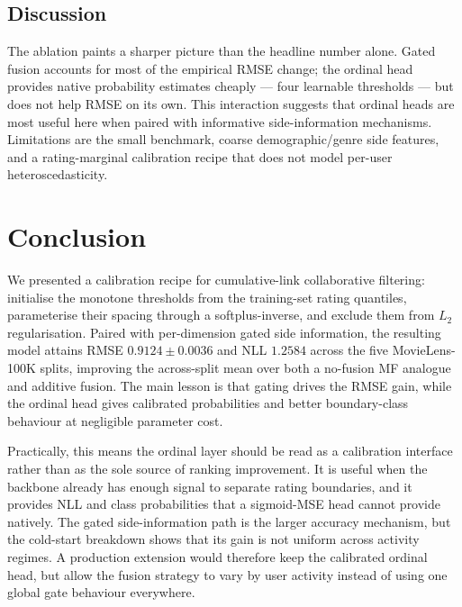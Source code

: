 \documentclass{article} %
\begin{document}
\subsection{Discussion}
The ablation paints a sharper picture than the headline number alone. Gated
fusion accounts for most of the empirical RMSE change; the ordinal head
provides native probability estimates cheaply --- four learnable thresholds
--- but does not help RMSE on its own. This interaction suggests that ordinal
heads are most useful here when paired with informative side-information
mechanisms. Limitations are the small benchmark, coarse demographic/genre side
features, and a rating-marginal calibration recipe that does not model
per-user heteroscedasticity.

\section{Conclusion}
\label{sec:conclusion}
We presented a calibration recipe for cumulative-link collaborative
filtering: initialise the monotone thresholds from the training-set rating
quantiles, parameterise their spacing through a softplus-inverse, and
exclude them from $L_2$ regularisation. Paired with per-dimension gated side
information, the resulting model attains RMSE $0.9124\pm0.0036$ and NLL
$1.2584$ across the five MovieLens-100K splits, improving the across-split
mean over both a no-fusion MF analogue and additive fusion. The main lesson is
that gating drives the RMSE gain, while the ordinal head gives calibrated
probabilities and better boundary-class behaviour at negligible parameter
cost.

Practically, this means the ordinal layer should be read as a calibration
interface rather than as the sole source of ranking improvement. It is useful
when the backbone already has enough signal to separate rating boundaries, and
it provides NLL and class probabilities that a sigmoid-MSE head cannot provide
natively. The gated side-information path is the larger accuracy mechanism, but
the cold-start breakdown shows that its gain is not uniform across activity
regimes. A production extension would therefore keep the calibrated ordinal
head, but allow the fusion strategy to vary by user activity instead of using
one global gate behaviour everywhere.

\begingroup
\footnotesize
\setlength{\parskip}{0pt}
\setlength{\itemsep}{0pt}


\endgroup
\end{document}
